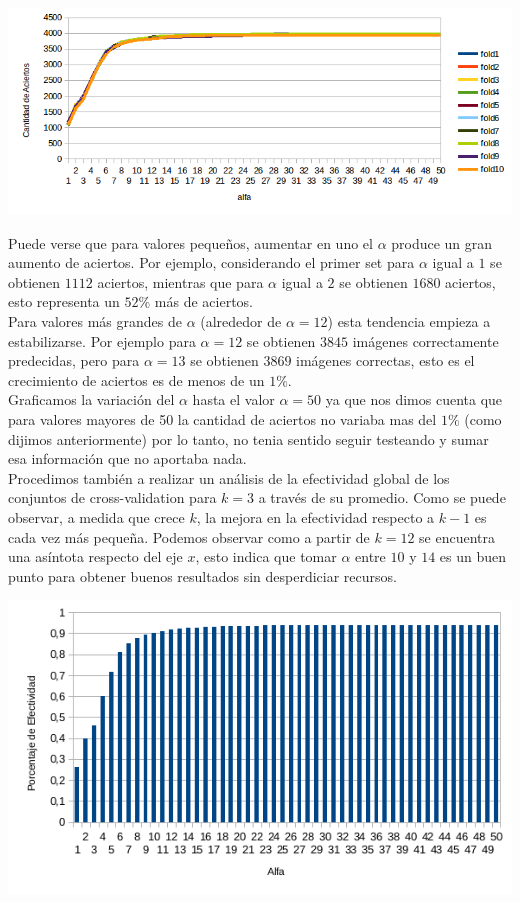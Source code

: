 \begin{center}
\includegraphics[scale=0.6]{nuevosResultados/pca/alfa/1.png}
\end{center}

Puede verse que para valores pequeños, aumentar en uno el $\alpha$ produce un gran aumento de aciertos. Por ejemplo, considerando el primer set para $\alpha$ igual a $1$ se obtienen $1112$ aciertos, mientras que para $\alpha$ igual a $2$ se obtienen $1680$ aciertos, esto representa un $52\%$ más de aciertos.
\\
Para valores más grandes de $\alpha$ (alrededor de $\alpha = 12$) esta tendencia empieza a estabilizarse. Por ejemplo para $\alpha = 12$ se obtienen $3845$ imágenes correctamente predecidas, pero para $\alpha = 13$ se obtienen $3869$ imágenes correctas, esto es el crecimiento de aciertos es de menos de un $1\%$.
\\
Graficamos la variación del $\alpha$ hasta el valor $\alpha = 50$ ya que nos dimos cuenta que para valores mayores de 50 la cantidad de aciertos no variaba mas del $1\%$ (como dijimos anteriormente) por lo tanto, no tenia sentido seguir testeando y sumar esa información que no aportaba nada.
\\

Procedimos también a realizar un análisis de la efectividad global de los conjuntos de cross-validation para $k=3$ a través de su promedio. Como se puede observar, a medida que crece $k$, la mejora en la efectividad respecto a $k-1$ es cada vez más pequeña. Podemos observar como a partir de $k=12$ se encuentra una asíntota respecto del eje $x$, esto indica que tomar $\alpha$ entre $10$ y $14$ es un buen punto para obtener buenos resultados sin desperdiciar recursos.

\begin{center}
\includegraphics[scale=0.6]{nuevosResultados/alfaconk=3.png}\\
\end{center}

